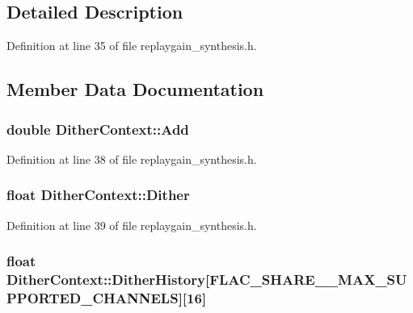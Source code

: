 \subsection{Detailed Description}


Definition at line 35 of file replaygain\+\_\+synthesis.\+h.



\subsection{Member Data Documentation}
\subsubsection[{\texorpdfstring{Add}{Add}}]{\setlength{\rightskip}{0pt plus 5cm}double Dither\+Context\+::\+Add}\hypertarget{struct_dither_context_a81d1334271585e5249e3295565453519}{}\label{struct_dither_context_a81d1334271585e5249e3295565453519}


Definition at line 38 of file replaygain\+\_\+synthesis.\+h.

\subsubsection[{\texorpdfstring{Dither}{Dither}}]{\setlength{\rightskip}{0pt plus 5cm}float Dither\+Context\+::\+Dither}\hypertarget{struct_dither_context_a2bdd64b539541ea62a481830ec80b1ef}{}\label{struct_dither_context_a2bdd64b539541ea62a481830ec80b1ef}


Definition at line 39 of file replaygain\+\_\+synthesis.\+h.

\subsubsection[{\texorpdfstring{Dither\+History}{DitherHistory}}]{\setlength{\rightskip}{0pt plus 5cm}float Dither\+Context\+::\+Dither\+History\mbox{[}{\bf F\+L\+A\+C\+\_\+\+S\+H\+A\+R\+E\+\_\+\+\_\+\+M\+A\+X\+\_\+\+S\+U\+P\+P\+O\+R\+T\+E\+D\+\_\+\+C\+H\+A\+N\+N\+E\+LS}\mbox{]}\mbox{[}16\mbox{]}}\hypertarget{struct_dither_context_acbb902c41c907f29d55f3f3a595aa2c6}{}\label{struct_dither_context_acbb902c41c907f29d55f3f3a595aa2c6}


